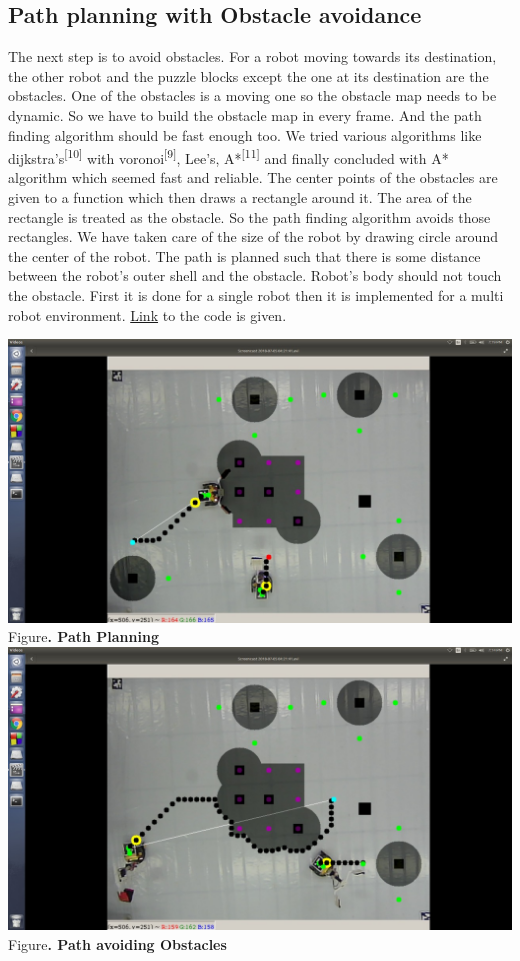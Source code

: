 \documentclass[a4paper,12pt,oneside]{book}
\begin{document}
\subsection*{Path planning with Obstacle avoidance}
The next step is to avoid obstacles. For a robot moving towards its destination, the other robot and the puzzle blocks except the one at its destination are the obstacles. One of the obstacles is a moving one so the obstacle map needs to be dynamic. So we have to build the obstacle map in every frame. And the path finding algorithm should be fast enough too. We tried various algorithms like dijkstra's\textsuperscript{[10]} with voronoi\textsuperscript{[9]}, Lee's, A*\textsuperscript{[11]} and finally concluded with A* algorithm which seemed fast and reliable. The center points of the obstacles are given to a function which then draws a rectangle around it. The area of the rectangle is treated as the obstacle. So the path finding algorithm avoids those rectangles. We have taken care of the size of the robot by drawing circle around the center of the robot. The path is planned such that there is some distance between the robot's outer shell and the obstacle. Robot's body should not touch the obstacle. First it is done for a single robot then it is implemented for a multi robot environment. \href{https://github.com/eYSIP-2018/Jigsaw_Puzzle_Solver_using_Multiple_Robots/blob/master/Final Codes/Python Codes/path_planning.py}{Link} to the code is given.
\begin{center}
\includegraphics[scale=0.3]{path2.jpg}\\
\small{Figure\textbf{. Path Planning}}\\
\includegraphics[scale=0.3]{path.jpg}\\
\small{Figure\textbf{. Path avoiding Obstacles}}
\end{center}
\end{document}
